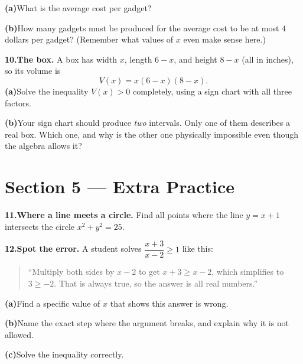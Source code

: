 \documentclass[12pt]{article}
\begin{document}
\textbf{(a)}\quad What is the average cost per gadget?
\vspace{5cm}

\textbf{(b)}\quad How many gadgets must be produced for the average cost to be at most $4$ dollars per gadget? (Remember what values of $x$ even make sense here.)

\vspace{7cm}

\newpage
\textbf{10.}\quad \textbf{The box.} A box has width $x$, length $6-x$, and height $8-x$ (all in inches), so its volume is
\[
  V(x) = x(6-x)(8-x) .
\]
\textbf{(a)}\quad Solve the inequality $V(x) > 0$ completely, using a sign chart with all three factors.

\vspace{5cm}
\textbf{(b)}\quad Your sign chart should produce \emph{two} intervals. Only one of them describes a real box. Which one, and why is the other one physically impossible even though the algebra allows it?

\vspace{3cm}

\newpage
\section*{Section 5 --- Extra Practice}

\textbf{11.}\quad \textbf{Where a line meets a circle.} Find all points where the line $y = x + 1$ intersects the circle $x^2 + y^2 = 25$. 

\vspace{7.5cm}
\newpage
\textbf{12.}\quad \textbf{Spot the error.} A student solves $\dfrac{x+3}{x-2} \ge 1$ like this:

\begin{quote}
``Multiply both sides by $x-2$ to get $x + 3 \ge x - 2$, which simplifies to $3 \ge -2$. That is always true, so the answer is all real numbers.''
\end{quote}

\textbf{(a)}\quad Find a specific value of $x$ that shows this answer is wrong.

\vspace{4cm}
\textbf{(b)}\quad Name the exact step where the argument breaks, and explain why it is not allowed.

\vspace{4cm}
\textbf{(c)}\quad Solve the inequality correctly.
\end{document}
